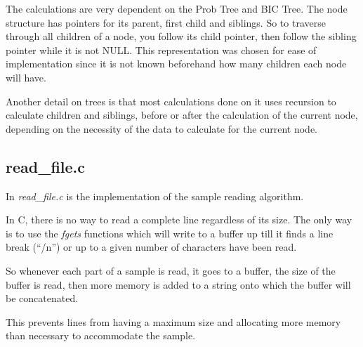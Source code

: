 \documentclass[brazil,11pt]{article}
\begin{document}
The calculations are very dependent on the Prob Tree and BIC Tree. The node structure has pointers for its parent, first child and siblings. So to traverse through all children of a node, you follow its child pointer, then follow the sibling pointer while it is not NULL. This representation was chosen for ease of implementation since it is not known beforehand how many children each node will have.

Another detail on trees is that most calculations done on it uses recursion to calculate children and siblings, before or after the calculation of the current node, depending on the necessity of the data to calculate for the current node.

\subsection{read\_file.c}
 
In \emph{read\_file.c} is the implementation of the sample reading algorithm.

In C, there is no way to read a complete line regardless of its size. The only way is to use the \emph{fgets} functions which will write to a buffer up till it finds a line break (``/n'') or up to a given number of characters have been read.

So whenever each part of a sample is read, it goes to a buffer, the size of the buffer is read, then more memory is added to a string onto which the buffer will be concatenated.

This prevents lines from having a maximum size and allocating more memory than necessary to accommodate the sample.
\end{document}
